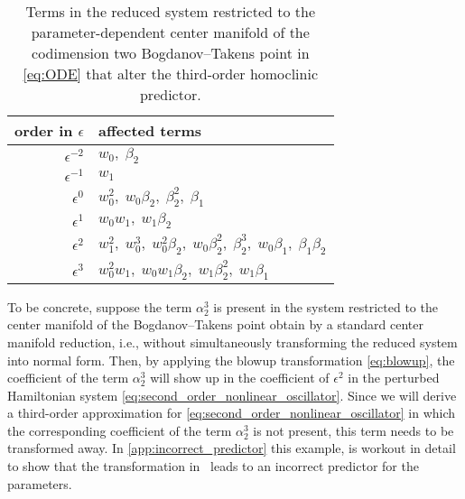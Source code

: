 \begin{table}
\begin{center}
\begingroup
\renewcommand*{\arraystretch}{1.4}
\begin{tabular}{rl}
\hline
order in $\epsilon$ & affected terms \\
\hline%
\(\epsilon^{-2}\) & \(w_0,\; \beta_2\)\\
\(\epsilon^{-1}\) & \(w_1\)\\
\(\epsilon^0\)  & \(w_0^2,\; w_0 \beta_2,\; \beta_2^2,\; \beta_1\)\\
\(\epsilon^1\)  & \(w_0w_1,\;  w_1\beta_2\) \\
\(\epsilon^2\)  & \(w_1^2,\; w_0^3,\; w_0^2 \beta_2 ,\; w_0 \beta_2^2 ,\; \beta_2^3,\; 
									w_0\beta_1 ,\; \beta_1 \beta_2\)\\
\(\epsilon^3\)  & \(w_0^2 w_1,\; w_0 w_1 \beta_2,\;  w_1 \beta_2^2,\;  w_1 \beta_1\) \\[0.2cm]
\hline
\end{tabular}
\endgroup
\caption{\label{fig:terms_affecting_predicor}
        Terms in the reduced system restricted to the parameter-dependent center manifold of the
        codimension two Bogdanov--Takens point in \cref{eq:ODE} that alter the third-order homoclinic predictor.} 
\end{center}
\end{table}
%
To be concrete, suppose the term $\alpha_2^3$ is present in the system
restricted to the center manifold of the Bogdanov--Takens point obtain by a
standard center manifold reduction, i.e., without simultaneously transforming
the reduced system into normal form. Then, by applying the blowup
transformation \cref{eq:blowup}, the coefficient of the term $\alpha_2^3$ will
show up in the coefficient of $\epsilon^2$ in the perturbed Hamiltonian
system \cref{eq:second_order_nonlinear_oscillator}. Since we will derive a
third-order approximation for \cref{eq:second_order_nonlinear_oscillator} in
which the corresponding coefficient of the term $\alpha_2^3$ is not present,
this term needs to be transformed away. In \cref{app:incorrect_predictor} this
example, is workout in detail to show that the transformation
in~\cite{Al-Hdaibat2016} leads to an incorrect predictor for the parameters.

